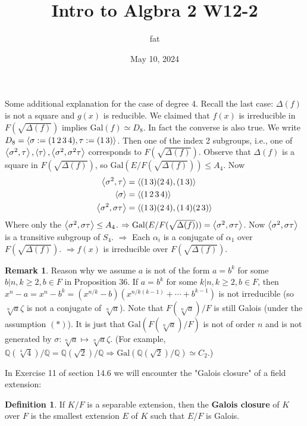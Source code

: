 \documentclass{article}
\title{Intro to Algbra 2 W12-2}
\author{fat}
\date{May 10, 2024}
\theoremstyle{definition}
\newtheorem{dfn}{Definition}
\newtheorem{rem}{Remark}
\newcommand{\QQ}{\mathbb Q}
\newcommand{\Ra}{\Rightarrow}
\newcommand{\Gal}{\text{Gal}}
\begin{document}
\maketitle
\thispagestyle{fancy}
\renewcommand{\footrulewidth}{0.4pt}
\cfoot{\thepage}
\renewcommand{\headrulewidth}{0.4pt}

Some additional explanation for the case of degree 4.
Recall the last case:
$\Delta(f)$ is not a square and $g(x)$ is reducible.
We claimed that $f(x)$ is irreducible in $F(\sqrt{\Delta(f)})$ implies $\Gal(f) \simeq D_8$.
In fact the converse is also true.
We write $D_8 = \ev{\sigma := (1 \, 2 \, 3 \, 4), \tau := (1 \, 3)}$.
Then one of the index 2 subgroups, i.e., one of $\ev{\sigma^2, \tau}, \ev{\tau}, \ev{\sigma^2, \sigma^2 \tau}$ corresponds to $F(\sqrt{\Delta(f)})$.
Observe that $\Delta(f)$ is a square in $F(\sqrt{\Delta(f)})$, so $\Gal(E/F(\sqrt{\Delta(f)})) \leq A_4$.
Now
\begin{align*}
	\ev{\sigma^2, \tau} &= \ev{(1 \, 3)(2 \, 4), (1 \, 3)}\\
	\ev{\sigma} &= \ev{(1 \, 2 \, 3 \, 4)}\\
	\ev{\sigma^2, \sigma \tau} &= \ev{(1 \, 3) (2 \, 4), (1 \, 4) (2 \, 3)}
\end{align*}
Where only the $\ev{\sigma^2, \sigma \tau} \leq A_4$.
$\Ra \Gal(E/F(\sqrt{\Delta(f)})) = \ev{\sigma^2, \sigma \tau}$.
Now $\ev{\sigma^2, \sigma \tau}$ is a transitive subgroup of $S_4$.
$\Ra$ Each $\alpha_i$ is a conjugate of $\alpha_1$ over $F(\sqrt{\Delta(f)})$.
$\Ra f(x)$ is irreducible over $F(\sqrt{\Delta(f)})$.

\begin{rem}
	Reason why we assume $a$ is not of the form $a = b^k$ for some $b | n, k \geq 2, b \in F$ in Proposition 36.
	If $a = b^k$ for some $k | n, k \geq 2, b \in F$, then $x^n - a = x^n - b^k = (x^{n/k} - b) (x^{n/k(k - 1)} + \cdots + b^{k - 1})$ is not irreducible (so $\sqrt[n]{a}\zeta$ is not a conjugate of $\sqrt[n]{a}$).
	Note that $F(\sqrt[n]{a})/F$ is still Galois (under the assumption $(*)$).
	It is just that $\Gal(F(\sqrt[n]{a})/F)$ is not of order $n$ and is not generated by $\sigma: \sqrt[n]{a} \mapsto \sqrt[n]{a} \zeta$.
	(For example, $\QQ(\sqrt[4]{4})/\QQ = \QQ(\sqrt{2})/\QQ \Ra \Gal(\QQ(\sqrt{2})/\QQ) \simeq C_2$.)
\end{rem}

In Exercise 11 of section 14.6 we will encounter the "Galois closure" of a field extension:

\begin{dfn}
	If $K/F$ is a separable extension, then the \textbf{Galois closure} of $K$ over $F$ is the smallest extension $E$ of $K$ such that $E/F$ is Galois.
\end{dfn}
\end{document}
